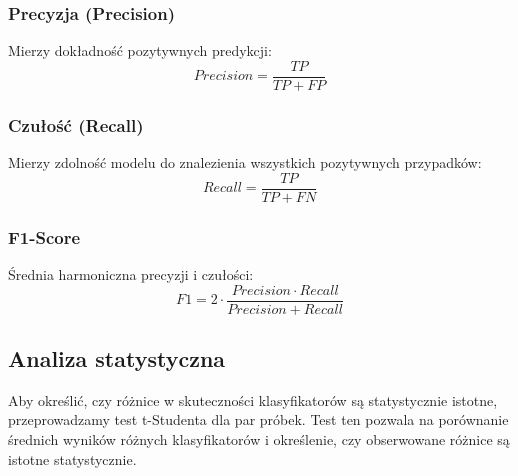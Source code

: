 \documentclass[runningheads]{llncs}
\begin{document}
\subsubsection{Precyzja (Precision)}
Mierzy dokładność pozytywnych predykcji:
\begin{equation}
    Precision = \frac{TP}{TP + FP}
\end{equation}

\subsubsection{Czułość (Recall)}
Mierzy zdolność modelu do znalezienia wszystkich pozytywnych przypadków:
\begin{equation}
    Recall = \frac{TP}{TP + FN}
\end{equation}

\subsubsection{F1-Score}
Średnia harmoniczna precyzji i czułości:
\begin{equation}
    F1 = 2 \cdot \frac{Precision \cdot Recall}{Precision + Recall}
\end{equation}

\subsection{Analiza statystyczna}
Aby określić, czy różnice w skuteczności klasyfikatorów są statystycznie istotne, przeprowadzamy test t-Studenta dla par próbek. Test ten pozwala na porównanie średnich wyników różnych klasyfikatorów i określenie, czy obserwowane różnice są istotne statystycznie.
\begin{credits}

\end{credits}
%
%
%
% 
% 
%


\end{document}
